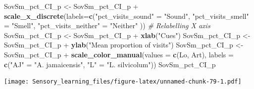 \documentclass[]{article}
\newenvironment{Shaded}{\begin{snugshade}}{\end{snugshade}}
\newcommand{\KeywordTok}[1]{\textcolor[rgb]{0.13,0.29,0.53}{\textbf{{#1}}}}
\newcommand{\DataTypeTok}[1]{\textcolor[rgb]{0.13,0.29,0.53}{{#1}}}
\newcommand{\StringTok}[1]{\textcolor[rgb]{0.31,0.60,0.02}{{#1}}}
\newcommand{\CommentTok}[1]{\textcolor[rgb]{0.56,0.35,0.01}{\textit{{#1}}}}
\newcommand{\NormalTok}[1]{{#1}}
\begin{document}
\begin{Shaded}
\begin{Highlighting}[]
\NormalTok{SovSm_pct_CI_p <-}\StringTok{ }\NormalTok{SovSm_pct_CI_p +}\StringTok{ }\KeywordTok{scale_x_discrete}\NormalTok{(}\DataTypeTok{labels=}\KeywordTok{c}\NormalTok{(}\StringTok{"pct_visits_sound"} \NormalTok{=}\StringTok{ "Sound"}\NormalTok{, }\StringTok{"pct_visits_smell"} \NormalTok{=}\StringTok{ "Smell"}\NormalTok{,}
                              \StringTok{"pct_visits_neither"} \NormalTok{=}\StringTok{ "Neither"} \NormalTok{))  }\CommentTok{# Relabelling X axis}
\NormalTok{SovSm_pct_CI_p <-}\StringTok{ }\NormalTok{SovSm_pct_CI_p +}\StringTok{ }\KeywordTok{xlab}\NormalTok{(}\StringTok{"Cues"}\NormalTok{)}
\NormalTok{SovSm_pct_CI_p <-}\StringTok{ }\NormalTok{SovSm_pct_CI_p +}\StringTok{ }\KeywordTok{ylab}\NormalTok{(}\StringTok{"Mean proportion of visits"}\NormalTok{)}
\NormalTok{SovSm_pct_CI_p <-}\StringTok{ }\NormalTok{SovSm_pct_CI_p +}\StringTok{  }\KeywordTok{scale_color_manual}\NormalTok{(}\DataTypeTok{values =} \KeywordTok{c}\NormalTok{(Lo, Art), }\DataTypeTok{labels =} \KeywordTok{c}\NormalTok{(}\StringTok{"AJ"} \NormalTok{=}\StringTok{ "A. jamaicensis"}\NormalTok{, }\StringTok{"L"} \NormalTok{=}\StringTok{ "L. silvicolum"}\NormalTok{))}
\NormalTok{SovSm_pct_CI_p                    }
\end{Highlighting}
\end{Shaded}

\texttt{[image: Sensory\_learning\_files/figure-latex/unnamed-chunk-79-1.pdf]}
\end{document}
